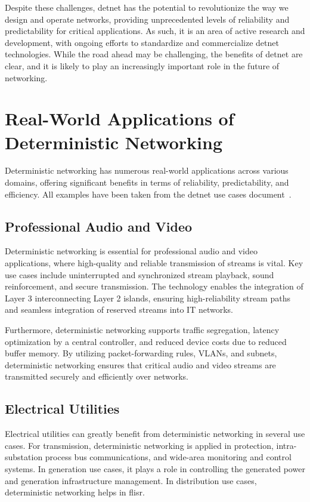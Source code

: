 \documentclass[runningheads]{llncs}
\begin{document}
Despite these challenges, \gls{detnet} has the potential to revolutionize the way we design and operate networks, providing unprecedented levels of reliability and predictability for critical applications. As such, it is an area of active research and development, with ongoing efforts to standardize and commercialize \gls{detnet} technologies. While the road ahead may be challenging, the benefits of \gls{detnet} are clear, and it is likely to play an increasingly important role in the future of networking.

\section{Real-World Applications of Deterministic Networking}

Deterministic networking has numerous real-world applications across various domains, offering significant benefits in terms of reliability, predictability, and efficiency. All examples have been taken from the \gls{detnet} use cases document~\cite{rfc8578}.

\subsection{Professional Audio and Video}
Deterministic networking is essential for professional audio and video applications, where high-quality and reliable transmission of streams is vital. Key use cases include uninterrupted and synchronized stream playback, sound reinforcement, and secure transmission. The technology enables the integration of Layer 3 interconnecting Layer 2 islands, ensuring high-reliability stream paths and seamless integration of reserved streams into IT networks.

Furthermore, deterministic networking supports traffic segregation, latency optimization by a central controller, and reduced device costs due to reduced buffer memory. By utilizing packet-forwarding rules, VLANs, and subnets, deterministic networking ensures that critical audio and video streams are transmitted securely and efficiently over networks.

\subsection{Electrical Utilities}
Electrical utilities can greatly benefit from deterministic networking in several use cases. For transmission, deterministic networking is applied in protection, intra-substation process bus communications, and wide-area monitoring and control systems. In generation use cases, it plays a role in controlling the generated power and generation infrastructure management. In distribution use cases, deterministic networking helps in \gls{flisr}.
\end{document}
